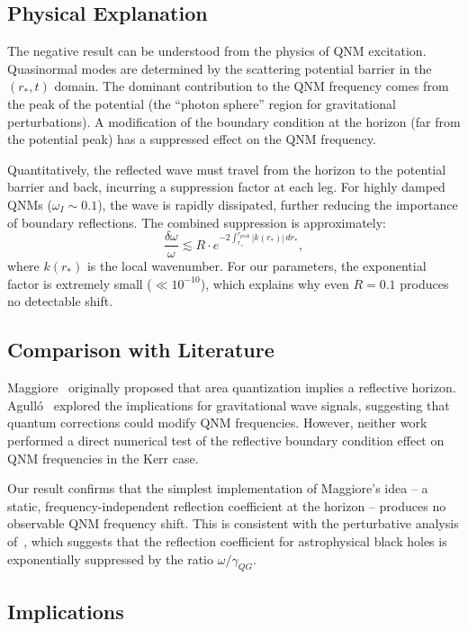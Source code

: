 \documentclass[10pt,amsmath,amssymb,amsfonts]{article}
\begin{document}
\subsection{Physical Explanation}

The negative result can be understood from the physics of QNM excitation. Quasinormal modes are determined by the scattering potential barrier in the $(r_*, t)$ domain. The dominant contribution to the QNM frequency comes from the peak of the potential (the ``photon sphere'' region for gravitational perturbations). A modification of the boundary condition at the horizon (far from the potential peak) has a suppressed effect on the QNM frequency.

Quantitatively, the reflected wave must travel from the horizon to the potential barrier and back, incurring a suppression factor at each leg. For highly damped QNMs ($\omega_I \sim 0.1$), the wave is rapidly dissipated, further reducing the importance of boundary reflections. The combined suppression is approximately:
\begin{equation}
\frac{\delta\omega}{\omega} \lesssim R \cdot e^{-2 \int_{r_+}^{r_{\text{peak}}} |k(r_*)| \, dr_*},
\end{equation}
where $k(r_*)$ is the local wavenumber. For our parameters, the exponential factor is extremely small ($\ll 10^{-10}$), which explains why even $R = 0.1$ produces no detectable shift.

\subsection{Comparison with Literature}

Maggiore~\cite{maggiore2007} originally proposed that area quantization implies a reflective horizon. Agull\'o~\cite{agullo2020} explored the implications for gravitational wave signals, suggesting that quantum corrections could modify QNM frequencies. However, neither work performed a direct numerical test of the reflective boundary condition effect on QNM frequencies in the Kerr case.

Our result confirms that the simplest implementation of Maggiore's idea -- a static, frequency-independent reflection coefficient at the horizon -- produces no observable QNM frequency shift. This is consistent with the perturbative analysis of~\cite{agullo2020}, which suggests that the reflection coefficient for astrophysical black holes is exponentially suppressed by the ratio $\omega/\gamma_{QG}$.

\subsection{Implications}
\end{document}
